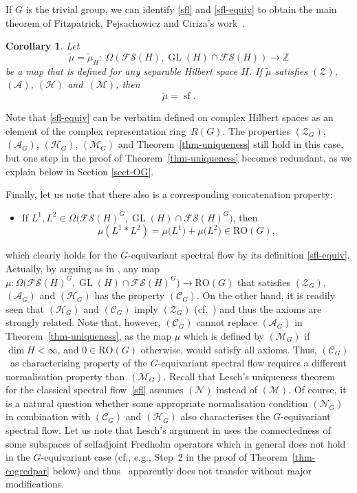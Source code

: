 \documentclass[pdftex]{sigma}
\numberwithin{equation}{section}
\newtheorem{Corollary}[Theorem]{Corollary}
\theoremstyle{definition}
\DeclareMathOperator{\sfl}{sf}
\DeclareMathOperator{\GL}{GL}
\begin{document}
If $G$ is the trivial group, we can identify \eqref{sfl} and \eqref{sfl-equiv} to obtain the main theorem of Fitzpatrick, Pejsachowicz and Ciriza's work~\cite{JacoboUniqueness}.

\begin{Corollary}\label{cor-uniqueness}
Let
\[\widetilde{\mu}=\widetilde{\mu}_{H}\colon \ \Omega(\mathcal{FS}(H),\GL(H)\cap\mathcal{FS}(H))\rightarrow\mathbb{Z}\]
be a map that is defined for any separable Hilbert space $H$. If $\widetilde{\mu}$ satisfies $(\mathcal{Z})$, $(\mathcal{A})$, $(\mathcal{H})$ and~$(\mathcal{M})$, then
\[\widetilde{\mu}=\sfl.\]
\end{Corollary}

Note that \eqref{sfl-equiv} can be verbatim defined on complex Hilbert spaces as an element of the complex representation ring~$R(G)$. The properties $(\mathcal{Z}_G)$, $(\mathcal{A}_G)$, $(\mathcal{H}_G)$, $(\mathcal{M}_G)$ and Theorem~\ref{thm-uniqueness} still hold in this case, but one step in the proof of Theorem~\ref{thm-uniqueness} becomes redundant, as we explain below in Section \ref{sect-OG}.

Finally, let us note that there also is a corresponding concatenation property:
\begin{itemize}\itemsep=0pt
 \item[$(\mathcal{C}_G)$] If $L^1,L^2\in\Omega\bigl(\mathcal{FS}(H)^G,\GL(H)\cap\mathcal{FS}(H)^G\bigr)$, then
 \[\mu(L^1\ast L^2)=\mu\bigl(L^1\bigr)+\mu\bigl(L^2\bigr)\in \mathrm{RO}(G),\]
\end{itemize}
which clearly holds for the $G$-equivariant spectral flow by its definition \eqref{sfl-equiv}. Actually, by arguing as in \cite[Proposition~4.26]{Robbin-Salamon}, any map $\mu\colon \Omega\bigl(\mathcal{FS}(H)^G,\GL(H)\cap\mathcal{FS}(H)^G\bigr)\rightarrow \mathrm{RO}(G)$ that satisfies $(\mathcal{Z}_G)$, $(\mathcal{A}_G)$ and $(\mathcal{H}_G)$ has the property $(\mathcal{C}_G)$. On the other hand, it is readily seen that $(\mathcal{H}_G)$ and $(\mathcal{C}_G)$ imply $(\mathcal{Z}_G)$ (cf.\ \cite[Lemma~5.3]{Lesch}) and thus the axioms are strongly related. Note that, however, $(\mathcal{C}_G)$ cannot replace $(\mathcal{A}_G)$ in Theorem~\ref{thm-uniqueness}, as the map $\mu$ which is defined by $(\mathcal{M}_G)$ if $\dim H<\infty$, and $0\in \mathrm{RO}(G)$ otherwise, would satisfy all axioms. Thus, $(\mathcal{C}_G)$~as characterising property of the $G$-equivariant spectral flow requires a different normalisation property than~$(\mathcal{M}_G)$. Recall that Lesch's uniqueness theorem~\cite{Lesch} for the classical spectral flow~\eqref{sfl} assumes $(\mathcal{N})$ instead of $(\mathcal{M})$. Of course, it is a natural question whether some appropriate normalisation condition $(\mathcal{N}_G)$ in combination with $(\mathcal{C}_G)$ and $(\mathcal{H}_G)$ also characterises the $G$-equivariant spectral flow. Let us note that Lesch's argument in \cite[Section~5.3]{Lesch} uses the connectedness of some subspaces of selfadjoint Fredholm operators which in general does not hold in the $G$-equivariant case (cf., e.g., Step~2 in the proof of Theorem~\ref{thm-cogredpar} below) and thus~\cite{Lesch} apparently does not transfer without major modifications.
\end{document}
